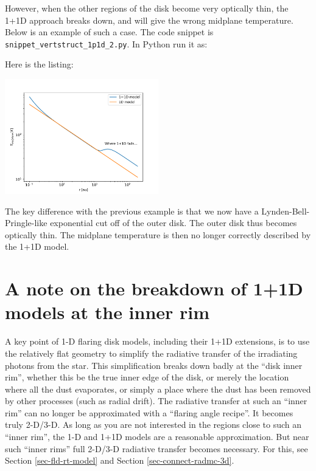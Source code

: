 \documentclass{book}
\newcommand{\code}[1]{{\small\tt #1}}
\begin{document}
However, when the other regions of the disk become very optically thin,
the 1+1D approach breaks down, and will give the wrong midplane temperature.
Below is an example of such a case. The code snippet is
\code{snippet\_vertstruct\_1p1d\_2.py}. In Python run it as:
\begin{codebox}
\end{codebox}
Here is the listing:

\centerline{\includegraphics[width=0.5\textwidth]{../snippets/fig_snippet_vertstruct_1p1d_2_1.pdf}}
%
The key difference with the previous example is that we now have a
Lynden-Bell-Pringle-like exponential cut off of the outer disk. The
outer disk thus becomes optically thin. The midplane temperature is
then no longer correctly described by the 1+1D model. 




\section{A note on the breakdown of 1+1D models at the inner rim}
\label{sec-dust-inner-rim}
%
A key point of 1-D flaring disk models, including their 1+1D extensions, is to
use the relatively flat geometry to simplify the radiative transfer of the
irradiating photons from the star. This simplification breaks down badly at the
``disk inner rim'', whether this be the true inner edge of the disk, or merely
the location where all the dust evaporates, or simply a place where the dust has
been removed by other processes (such as radial drift). The radiative transfer
at such an ``inner rim'' can no longer be approximated with a ``flaring angle
recipe''. It becomes truly 2-D/3-D. As long as you are not interested in the
regions close to such an ``inner rim'', the 1-D and 1+1D models are a reasonable
approximation. But near such ``inner rims'' full 2-D/3-D radiative transfer
becomes necessary. For this, see Section \ref{sec-fld-rt-model} and
Section \ref{sec-connect-radmc-3d}.
\end{document}
